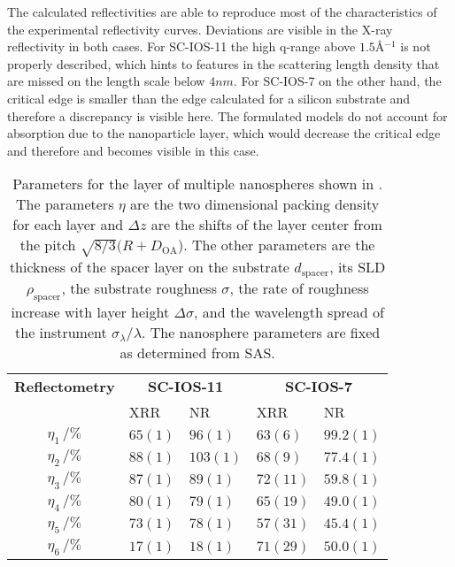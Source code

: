 \documentclass[\main/dresen_thesis.tex]{subfiles}
\begin{document}
  The calculated reflectivities are able to reproduce most of the characteristics of the experimental reflectivity curves.
  Deviations are visible in the X-ray reflectivity in both cases.
  For SC-IOS-11 the high q-range above $1.5 \unit{\angstrom^{-1}}$ is not properly described, which hints to features in the scattering length density that are missed on the length scale below $4 \unit{nm}$.
  For SC-IOS-7 on the other hand, the critical edge is smaller than the edge calculated for a silicon substrate and therefore a discrepancy is visible here.
  The formulated models do not account for absorption due to the nanoparticle layer, which would decrease the critical edge and therefore and becomes visible in this case.

  \begin{table}[!htbp]
    \centering
    \caption{\label{tab:looselyPackedNP:layers:reflectivity}Parameters for the layer of multiple nanospheres shown in . The parameters $\eta$ are the two dimensional packing density for each layer and $\Delta z$ are the shifts of the layer center from the pitch $\sqrt{8/3} (R+D_\mathrm{OA}$). The other parameters are the thickness of the spacer layer on the substrate $d_\mathrm{spacer}$, its SLD $\rho_\mathrm{spacer}$, the substrate roughness $\sigma$, the rate of roughness increase with layer height $\Delta \sigma$, and the wavelength spread of the instrument $\sigma_\lambda / \lambda$. The nanosphere parameters are fixed as determined from SAS.}
    \begin{tabular}{ c | l | l | l | l}
      \rule{0pt}{2ex} \textbf{Reflectometry}  & \multicolumn{2}{c}{\textbf{SC-IOS-11}} & \multicolumn{2}{c}{\textbf{SC-IOS-7}} \\
      \rule{0pt}{2ex}                   & XRR       & NR        & XRR       & NR \\
      \hline
       $\eta_1     \, / \unit{\%}$      & $65(1)$   & $96(1)$   & $63(6)$   & $99.2(1)$\\
       $\eta_2     \, / \unit{\%}$      & $88(1)$   & $103(1)$  & $68(9)$   & $77.4(1)$\\
       $\eta_3     \, / \unit{\%}$      & $87(1)$   & $89(1)$   & $72(11)$  & $59.8(1)$\\
       $\eta_4     \, / \unit{\%}$      & $80(1)$   & $79(1)$   & $65(19)$  & $49.0(1)$\\
       $\eta_5     \, / \unit{\%}$      & $73(1)$   & $78(1)$   & $57(31)$  & $45.4(1)$\\
       $\eta_6     \, / \unit{\%}$      & $17(1)$   & $18(1)$   & $71(29)$  & $50.0(1)$\\

\end{tabular}
\end{table}
\end{document}
